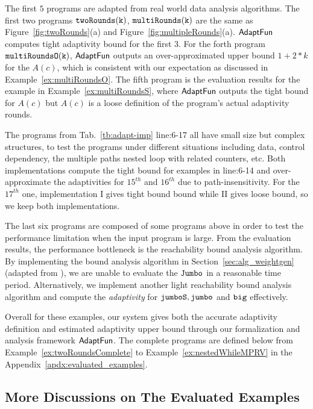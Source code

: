    The first $5$ programs are adapted from real world data analysis algorithms.
    The first two programs $\mathtt{twoRounds(k)}$, $ \mathtt{multiRounds(k)}$ are the same as Figure~\ref{fig:twoRounds}(a) and Figure~\ref{fig:multipleRounds}(a).
    $\textsf{AdaptFun}$ computes tight adaptivity bound for the first 3.
For the forth program $\mathtt{multiRoundsO(k)}$, $\textsf{AdaptFun}$ outputs an over-approximated upper bound $1 + 2*k$ for the $A(c)$, which is consistent with our expectation as discussed in Example~\ref{ex:multiRoundsO}. 
The fifth program is the evaluation results for the example in Example~\ref{ex:multiRoundsS}, where $\textsf{AdaptFun}$ outputs the tight bound for $A(c)$ but $A(c)$ is a loose definition of the program's actual adaptivity rounds.
%

The programs from Tab.~\ref{tb:adapt-imp} line:6-17 all have small size but complex structures, to test the programs under different situations including
data, control dependency,
the multiple paths nested loop with related counters, etc.
Both implementations compute the tight bound for examples in line:6-14
and over-approximate the adaptivities for $15^{th}$ and $16^{th}$ due to path-insensitivity.
For the $17^{th}$ one, implementation I gives tight bound bound while II gives loose bound, so we keep both implementations.

The last six programs are composed of some programs above in order to test the performance limitation when the input program is large. 
From the evaluation results, the performance bottleneck is the reachability bound analysis algorithm.
By implementing the bound analysis algorithm in Section~\ref{sec:alg_weightgen} (adapted from \cite{sinn2017complexity}), we are unable to evaluate the $\mathtt{Jumbo}$ in a reasonable time period.
Alternatively, we implement another light reachability bound analysis algorithm and compute the \emph{adaptivity} for
$\mathtt{jumboS}, \mathtt{jumbo}$ and $\mathtt{big}$ effectively.

Overall for these examples, our system gives both the accurate adaptivity definition and estimated
adaptivity upper bound through our formalization and analysis framework $\textsf{AdaptFun}$.
The complete programs are defined below from Example~\ref{ex:twoRoundsComplete} to Example~\ref{ex:nestedWhileMPRV} in the Appendix~\ref{apdx:evaluated_examples}.



 \subsection{More Discussions on The Evaluated Examples}  
